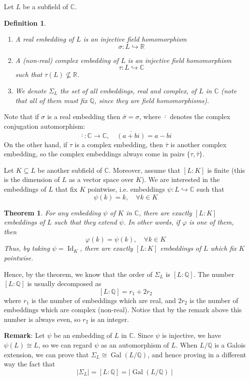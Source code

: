 \documentclass[12pt]{article}
\newtheorem{thm}{Theorem}
\newtheorem{defn}{Definition}
\newcommand{\Reals}{\mathbb{R}}
\newcommand{\Complex}{\mathbb{C}}
\newcommand{\Rats}{\mathbb{Q}}
\begin{document}
Let $L$ be a subfield of $\Complex$.

\begin{defn}\quad
\begin{enumerate}
\item A \emph{real embedding} of $L$ is an injective field
homomorphism
$$ \sigma\colon L \hookrightarrow \Reals $$

\item A (non-real) \emph{complex embedding} of $L$ is an injective
field homomorphism
$$ \tau\colon L \hookrightarrow \Complex $$
such that $\tau(L)\nsubseteq \Reals$.

\item We denote $\Sigma_L$ the set of all embeddings, real and
complex, of $L$ in $\Complex$ (note that all of them must fix
$\Rats$, since they are field homomorphisms).
\end{enumerate}
\end{defn}

Note that if $\sigma$ is a real embedding then
$\bar{\sigma}=\sigma$, where $\overline{\cdot}$ denotes the
complex conjugation automorphism: $$ \overline{\cdot}\colon
\Complex \to \Complex,\quad \overline{(a+bi)}=a-bi$$ On the other
hand, if $\tau$ is a complex embedding, then $\bar{\tau}$ is
another complex embedding, so the complex embeddings always come
in pairs $\{\tau,\bar{\tau}\}$.

Let $K\subseteq L$ be another subfield of $\Complex$. Moreover,
assume that $[L:K]$ is finite (this is the dimension of $L$ as a
vector space over $K$). We are interested in the embeddings of $L$
that fix $K$ pointwise, i.e. embeddings $\psi\colon L
\hookrightarrow \Complex$ such that
$$\psi(k)=k,\quad \forall k\in K$$

\begin{thm}
For any embedding $\psi$ of $K$ in $\Complex$, there are exactly
$[L:K]$ embeddings of $L$ such that they extend $\psi$. In other
words, if $\varphi$ is one of them, then
$$\varphi(k)=\psi(k),\quad \forall k\in K$$
Thus, by taking $\psi=\operatorname{Id}_K$, there are exactly
$[L:K]$ embeddings of $L$ which fix $K$ pointwise.
\end{thm}

Hence, by the theorem, we know that the order of $\Sigma_L$ is
$[L:\Rats]$. The number $[L:\Rats]$ is usually decomposed as
$$[L:\Rats]=r_1+2r_2$$
where $r_1$ is the number of embeddings which are real, and $2r_2$
is the number of embeddings which are complex (non-real). Notice
that by the remark above this number is always even, so $r_2$ is
an integer.

{\bf Remark}: Let $\psi$ be an embedding of $L$ in $\Complex$.
Since $\psi$ is injective, we have $\psi(L)\cong L$, so we can
regard $\psi$ as an automorphism of $L$. When $L/\mathbb{Q}$ is a
Galois extension, we can prove that $\Sigma_L\cong
\operatorname{Gal}(L/\Rats)$, and hence proving in a different way
the fact that
$$\mid \Sigma_L \mid = [L:\Rats]= \mid
\operatorname{Gal}(L/\Rats)\mid$$
\end{document}
